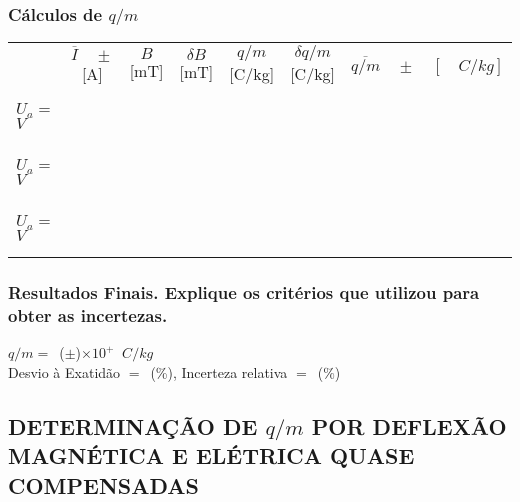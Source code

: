 \documentclass[a4paper,12pt]{article}  %
\begin{document}
\subsubsection{\sf Cálculos de $q/m$}
\label{sec:calc}
\begin{center}
	\begin{tabular}{l|c|c|c|c|c|c|}
	\cline{2-7}
	 & $\overline{I}\quad \pm$ [A] &  $B$ [mT] & $\delta B$  [mT] & $q/m$ [C/kg] & $\delta q/m$ [C/kg] & $\overline{q/m}\quad \pm \quad [\quad C/kg]$\\ \cline{2-7}
	 &&&&&&   \\ \cline{2-6}
	 &&&&&& \\ \cline{2-6}
	 $U_a=$ \underline{\makebox[1.2cm][r]{~}}$V$   &&&&&&  \\ \cline{2-6}
	 &&&&&& \\ \cline{2-6}
	 &&&&&& \\ \hline \hline
	  
	 &&&&&& \\ \cline{2-6}
	 &&&&&& \\ \cline{2-6}
	$U_a=$ \underline{\makebox[1.2cm][r]{~}}$V$  &&&&&& \\
	\cline{2-6}
	 &&&&&& \\ \cline{2-6}
	 &&&&&& \\
	 \hline \hline
	 &&&&&& \\ \cline{2-6}
	 &&&&&& \\ \cline{2-6}
	 $U_a=$ \underline{\makebox[1.2cm][r]{~}}$V$  &&&&&& \\ \cline{2-6}
	 &&&&&& \\ \cline{2-6}
	 &&&&&& \\
	 \cline{2-7} 
 	\end{tabular}
\end{center}


\subsubsection{\sf Resultados Finais. Explique os critérios que utilizou para obter as incertezas.}
\noindent  $q/m =$~(\underline{\makebox[1.5cm][r]{~}}$\pm$\underline{\makebox[1cm][r]{~}})$\times 10^{+} \;\;C/kg  $\\  

\noindent  Desvio à Exatidão $=$~\underline{\makebox[1cm][r]{~}}(\%), 
Incerteza relativa $=$~\underline{\makebox[1cm][r]{~}}($\%$) 

\subsection{\sf DETERMINAÇÃO DE $q/m$ POR DEFLEXÃO\\ MAGNÉTICA E ELÉTRICA QUASE COMPENSADAS }
\end{document}
